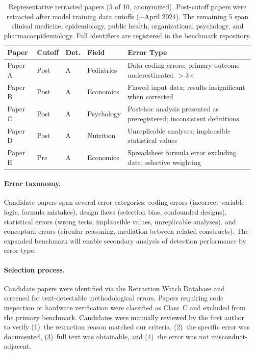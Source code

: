 \documentclass[11pt]{article}
\begin{document}
\begin{table}[h]
\centering
\caption{Representative retracted papers (5 of 10, anonymized). Post-cutoff papers were retracted after model training data cutoffs ($\sim$April 2024). The remaining 5 span clinical medicine, epidemiology, public health, organizational psychology, and pharmacoepidemiology. Full identifiers are registered in the benchmark repository.}
\label{tab:dataset}
\small
\begin{tabular}{p{1.2cm}p{0.8cm}p{0.5cm}p{2cm}p{5.5cm}}
\toprule
\textbf{Paper} & \textbf{Cutoff} & \textbf{Det.} & \textbf{Field} & \textbf{Error Type} \\
\midrule
Paper A & Post & A & Pediatrics & Data coding errors; primary outcome underestimated $>$3$\times$ \\
Paper B & Post & A & Economics & Flawed input data; results insignificant when corrected \\
Paper C & Post & A & Psychology & Post-hoc analysis presented as preregistered; inconsistent definitions \\
Paper D & Post & A & Nutrition & Unreplicable analyses; implausible statistical values \\
Paper E & Pre & A & Economics & Spreadsheet formula error excluding data; selective weighting \\
\bottomrule
\end{tabular}
\end{table}

\paragraph{Error taxonomy.} Candidate papers span several error categories: coding errors (incorrect variable logic, formula mistakes), design flaws (selection bias, confounded designs), statistical errors (wrong tests, implausible values, unreplicable analyses), and conceptual errors (circular reasoning, mediation between related constructs). The expanded benchmark will enable secondary analysis of detection performance by error type.

\paragraph{Selection process.} Candidate papers were identified via the Retraction Watch Database and screened for text-detectable methodological errors. Papers requiring code inspection or hardware verification were classified as Class~C and excluded from the primary benchmark. Candidates were manually reviewed by the first author to verify (1)~the retraction reason matched our criteria, (2)~the specific error was documented, (3)~full text was obtainable, and (4)~the error was not misconduct-adjacent.
\end{document}

